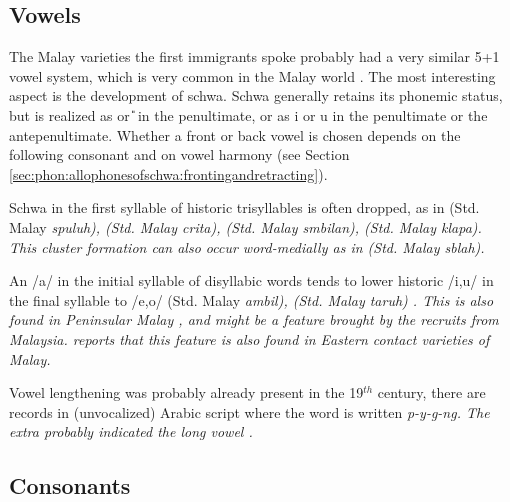 \subsection{Vowels}\label{sec:phon:hist:Vowels}
The Malay varieties the first immigrants spoke probably had a very similar 5+1 vowel system, which is very common in the Malay world \citep{Adelaar1985}. The most interesting aspect is the development of schwa. Schwa generally retains its phonemic status, but is realized as \I{} or \U{} in the penultimate, or as i or u in the penultimate or the antepenultimate. Whether a front or back vowel is chosen depends on the following consonant and on vowel harmony (see Section \ref{sec:phon:allophonesofschwa:frontingandretracting}).

Schwa in the first syllable of historic trisyllables is often dropped, as in   (Std. Malay  \em s\E puluh\em),  (Std. Malay c\E rita),  (Std. Malay \em s\E mbilan\em),   (Std. Malay k\E lapa). This cluster formation can also occur word-medially as in  (Std. Malay s\E b\E lah).

An /a/ in the initial syllable of disyllabic words tends to lower historic /i,u/ in the final syllable to /e,o/  (Std. Malay \em ambil\em),  (Std. Malay \em taruh\em) \citep[75]{Bichsel}. This is also found in Peninsular Malay \citep{Paauw2004}, and might be a feature brought by the recruits from Malaysia. \citet{Paauw2008phd} reports that this feature is also found in Eastern contact varieties of Malay.

Vowel lengthening was probably already present in the 19$^{th}$ century, there are records in (unvocalized) Arabic script where the word  is written \em p-y-g-ng\em. The extra  probably indicated the long vowel \citep[118]{Hussainmiya1987}.

\subsection{Consonants}\label{sec:phon:hist:Consonants}
